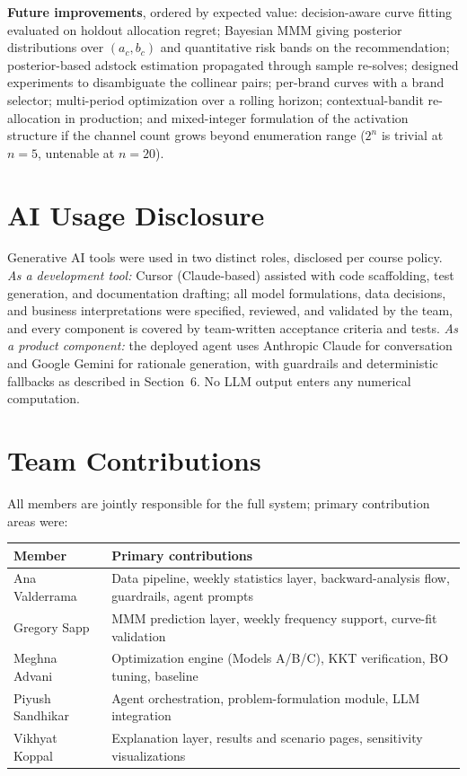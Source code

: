 \documentclass[11pt]{article}
\begin{document}
\textbf{Future improvements}, ordered by expected value: decision-aware curve fitting evaluated on holdout allocation regret; Bayesian MMM giving posterior distributions over $(a_c, b_c)$ and quantitative risk bands on the recommendation; posterior-based adstock estimation propagated through sample re-solves; designed experiments to disambiguate the collinear pairs; per-brand curves with a brand selector; multi-period optimization over a rolling horizon; contextual-bandit re-allocation in production; and mixed-integer formulation of the activation structure if the channel count grows beyond enumeration range ($2^n$ is trivial at $n=5$, untenable at $n=20$).

\section*{AI Usage Disclosure}

Generative AI tools were used in two distinct roles, disclosed per course policy. \emph{As a development tool:} Cursor (Claude-based) assisted with code scaffolding, test generation, and documentation drafting; all model formulations, data decisions, and business interpretations were specified, reviewed, and validated by the team, and every component is covered by team-written acceptance criteria and tests. \emph{As a product component:} the deployed agent uses Anthropic Claude for conversation and Google Gemini for rationale generation, with guardrails and deterministic fallbacks as described in Section~6. No LLM output enters any numerical computation.

\section*{Team Contributions}

All members are jointly responsible for the full system; primary contribution areas were:

\begin{center}
\begin{tabular}{ll}
\toprule
\textbf{Member} & \textbf{Primary contributions} \\
\midrule
Ana Valderrama & Data pipeline, weekly statistics layer, backward-analysis flow, guardrails, agent prompts \\
Gregory Sapp & MMM prediction layer, weekly frequency support, curve-fit validation \\
Meghna Advani & Optimization engine (Models A/B/C), KKT verification, BO tuning, baseline \\
Piyush Sandhikar & Agent orchestration, problem-formulation module, LLM integration \\
Vikhyat Koppal & Explanation layer, results and scenario pages, sensitivity visualizations \\
\bottomrule
\end{tabular}
\end{center}
\end{document}
